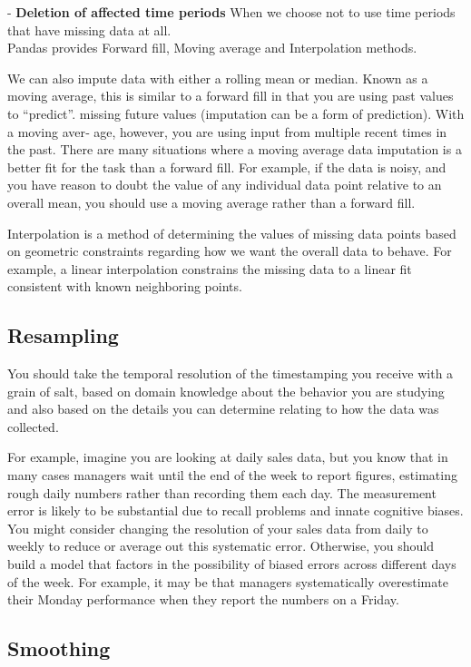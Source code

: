 \documentclass[openany]{book}
\begin{document}
- \textbf{Deletion of affected time periods}
When we choose not to use time periods that have missing data at all.  \\


Pandas provides Forward fill, Moving average and Interpolation methods. 

We can also impute data with either a rolling mean or median. Known as a moving average, this is similar to a forward fill in that you are using past values to “predict”. missing future values (imputation can be a form of prediction). With a moving aver‐ age, however, you are using input from multiple recent times in the past. There are many situations where a moving average data imputation is a better fit for the task than a forward fill. For example, if the data is noisy, and you have reason to doubt the value of any individual data point relative to an overall mean, you should use a moving average rather than a forward fill.

Interpolation is a method of determining the values of missing data points based on geometric constraints regarding how we want the overall data to behave. For example, a linear interpolation constrains the missing data to a linear fit consistent with known neighboring points.


\subsection{Resampling}

You should take the temporal resolution of the timestamping you receive with a grain of salt, based on domain knowledge about the behavior you are studying and also based on the details you can determine relating to how the data was collected.

For example, imagine you are looking at daily sales data, but you know that in many cases managers wait until the end of the week to report figures, estimating rough daily numbers rather than recording them each day. The measurement error is likely to be substantial due to recall problems and innate cognitive biases. You might consider changing the resolution of your sales data from daily to weekly to reduce or average out this systematic error. Otherwise, you should build a model that factors in the possibility of biased errors across different days of the week. For example, it may be that managers systematically overestimate their Monday performance when they report the numbers on a Friday.


\subsection{Smoothing}
\end{document}
